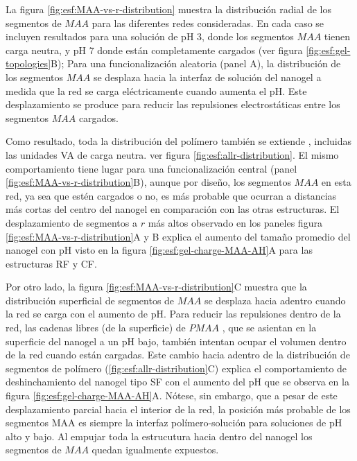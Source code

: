 La figura \ref{fig:esf:MAA-vs-r-distribution} muestra la distribuci\'on radial de los segmentos de $MAA$ para las diferentes redes consideradas.
En cada caso se incluyen  resultados para una soluci\'on de pH 3, donde los segmentos $MAA$ tienen carga neutra, y pH 7 donde est\'an completamente cargados (ver figura \ref{fig:esf:gel-topologies}B);
Para una funcionalizaci\'on aleatoria (panel A), la distribuci\'on de los segmentos $MAA$ se desplaza hacia la interfaz de soluci\'on del nanogel a medida que la red se carga el\'ectricamente cuando aumenta el pH.
Este desplazamiento se produce para reducir las repulsiones electrost\'aticas entre los segmentos $MAA$ cargados.

Como resultado, toda la distribuci\'on del pol\'imero tambi\'en se extiende %
, incluidas las unidades VA de carga neutra.  ver figura \ref{fig:esf:allr-distribution}.
El mismo comportamiento tiene lugar para una funcionalizaci\'on central (panel \ref{fig:esf:MAA-vs-r-distribution}B),
aunque por dise\~no, los segmentos $MAA$ en esta red, ya sea que est\'en cargados o no, es m\'as probable que ocurran a distancias m\'as cortas del centro del nanogel en comparaci\'on con las otras estructuras.
El desplazamiento de segmentos a $r$ m\'as altos observado en los paneles figura \ref{fig:esf:MAA-vs-r-distribution}A y B explica el aumento del tama\~no promedio del nanogel con pH visto en la figura \ref{fig:esf:gel-charge-MAA-AH}A para las estructuras RF y CF.


Por otro lado, la figura \ref{fig:esf:MAA-vs-r-distribution}C muestra que la distribuci\'on superficial de segmentos de $MAA$ se desplaza hacia adentro cuando la red se carga con el aumento de pH.
Para reducir las repulsiones dentro de la red, las cadenas libres (de la superficie) de $PMAA$ , que se asientan en la superficie del nanogel a un pH bajo, tambi\'en intentan ocupar el volumen dentro de la red cuando están cargadas.
Este cambio hacia adentro de la distribuci\'on de segmentos de pol\'imero (\ref{fig:esf:allr-distribution}C)
explica el comportamiento de deshinchamiento del nanogel tipo SF con el aumento del pH que se observa en la figura \ref{fig:esf:gel-charge-MAA-AH}A.
N\'otese, sin embargo, que a pesar de este desplazamiento parcial hacia el interior de la red, la posici\'on m\'as probable de los segmentos MAA es siempre la interfaz pol\'imero-soluci\'on para soluciones de pH alto y bajo. Al empujar toda la estrucutura hacia dentro del nanogel los segmentos de $MAA$ quedan igualmente expuestos.



